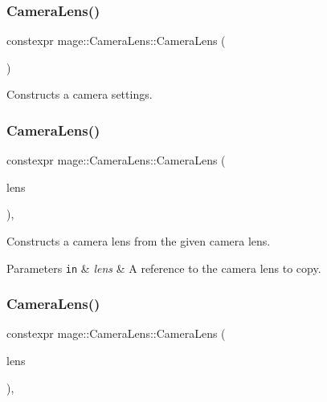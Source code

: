 \subsubsection{\texorpdfstring{Camera\+Lens()}{CameraLens()}\hspace{0.1cm}{\footnotesize\ttfamily [1/3]}}
{\footnotesize\ttfamily constexpr mage\+::\+Camera\+Lens\+::\+Camera\+Lens (\begin{DoxyParamCaption}{ }\end{DoxyParamCaption})\hspace{0.3cm}{\ttfamily [noexcept]}}

Constructs a camera settings. \hypertarget{classmage_1_1_camera_lens_a25ca45c6458715841e6f78d997756fe1}{}\label{classmage_1_1_camera_lens_a25ca45c6458715841e6f78d997756fe1} 
\subsubsection{\texorpdfstring{Camera\+Lens()}{CameraLens()}\hspace{0.1cm}{\footnotesize\ttfamily [2/3]}}
{\footnotesize\ttfamily constexpr mage\+::\+Camera\+Lens\+::\+Camera\+Lens (\begin{DoxyParamCaption}\item[{const \hyperlink{classmage_1_1_camera_lens}{Camera\+Lens} \&}]{lens }\end{DoxyParamCaption})\hspace{0.3cm}{\ttfamily [default]}, {\ttfamily [noexcept]}}

Constructs a camera lens from the given camera lens.


\begin{DoxyParams}[1]{Parameters}
\mbox{\tt in}  & {\em lens} & A reference to the camera lens to copy. \\
\hline
\end{DoxyParams}
\hypertarget{classmage_1_1_camera_lens_a00e4a71f7a386166849c8753e350e677}{}\label{classmage_1_1_camera_lens_a00e4a71f7a386166849c8753e350e677} 
\subsubsection{\texorpdfstring{Camera\+Lens()}{CameraLens()}\hspace{0.1cm}{\footnotesize\ttfamily [3/3]}}
{\footnotesize\ttfamily constexpr mage\+::\+Camera\+Lens\+::\+Camera\+Lens (\begin{DoxyParamCaption}\item[{\hyperlink{classmage_1_1_camera_lens}{Camera\+Lens} \&\&}]{lens }\end{DoxyParamCaption})\hspace{0.3cm}{\ttfamily [default]}, {\ttfamily [noexcept]}}

